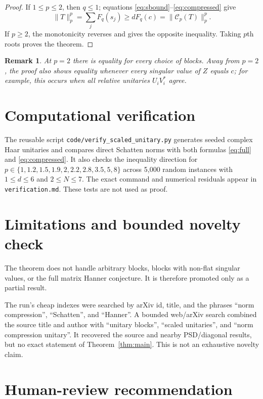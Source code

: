 \documentclass[11pt]{article}
\newtheorem{remark}{Remark}
\newcommand{\Cp}{\mathcal C_p}
\begin{document}
\begin{proof}
If $1\leq p\leq2$, then $q\leq1$; equations
\eqref{eq:sbound}--\eqref{eq:compressed} give
\[
 \lVert T\rVert_p^p=\sum_jF_q(s_j)\geq dF_q(c)
 =\lVert\Cp(T)\rVert_p^p.
\]
If $p\geq2$, the monotonicity reverses and gives the opposite inequality.
Taking $p$th roots proves the theorem.
\end{proof}

\begin{remark}
At $p=2$ there is equality for every choice of blocks.  Away from $p=2$, the
proof also shows equality whenever every singular value of $Z$ equals $c$;
for example, this occurs when all relative unitaries $U_iV_i^*$ agree.
\end{remark}

\section{Computational verification}

The reusable script \texttt{code/verify\_scaled\_unitary.py} generates seeded
complex Haar unitaries and compares direct Schatten norms with both formulas
\eqref{eq:full} and \eqref{eq:compressed}.  It also checks the inequality
direction for $p\in\{1,1.2,1.5,1.9,2,2.2,2.8,3.5,5,8\}$ across 5,000 random
instances with $1\leq d\leq6$ and $2\leq N\leq7$.  The exact command and
numerical residuals appear in \texttt{verification.md}.  These tests are not
used as proof.

\section{Limitations and bounded novelty check}

The theorem does not handle arbitrary blocks, blocks with non-flat singular
values, or the full matrix Hanner conjecture.  It is therefore promoted only
as a partial result.

The run's cheap indexes were searched by arXiv id, title, and the phrases
``norm compression'', ``Schatten'', and ``Hanner''.  A bounded web/arXiv
search combined the source title and author with ``unitary blocks'', ``scaled
unitaries'', and ``norm compression unitary''.  It recovered the source and
nearby PSD/diagonal results, but no exact statement of Theorem~\ref{thm:main}.
This is not an exhaustive novelty claim.

\section{Human-review recommendation}
\end{document}
